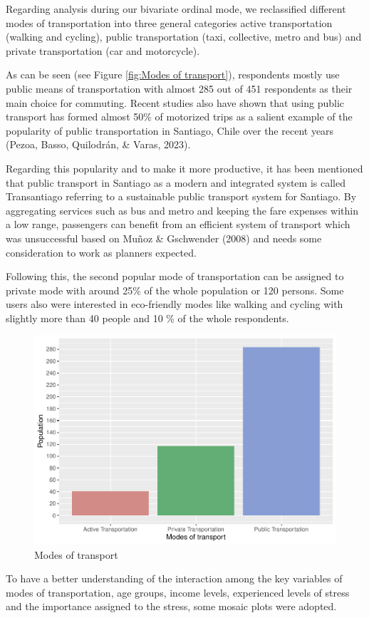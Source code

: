 \documentclass[
11pt, %
oneside, %
english, %
singlespacing, %
]{macthesis} %
\begin{document}
Regarding analysis during our bivariate ordinal mode, we reclassified different modes of transportation into three general categories active transportation (walking and cycling), public transportation (taxi, collective, metro and bus) and private transportation (car and motorcycle).

As can be seen (see Figure \ref{fig:Modes of transport}), respondents mostly use public means of transportation with almost 285 out of 451 respondents as their main choice for commuting. Recent studies also have shown that using public transport has formed almost 50\% of motorized trips as a salient example of the popularity of public transportation in Santiago, Chile over the recent years (Pezoa, Basso, Quilodrán, \& Varas, 2023).

Regarding this popularity and to make it more productive, it has been mentioned that public transport in Santiago as a modern and integrated system is called Transantiago referring to a sustainable public transport system for Santiago. By aggregating services such as bus and metro and keeping the fare expenses within a low range, passengers can benefit from an efficient system of transport which was unsuccessful based on Muñoz \& Gschwender (2008) and needs some consideration to work as planners expected.

Following this, the second popular mode of transportation can be assigned to private mode with around 25\% of the whole population or 120 persons. Some users also were interested in eco-friendly modes like walking and cycling with slightly more than 40 people and 10 \% of the whole respondents.
\begin{figure}

{\centering \includegraphics[width=0.85\linewidth]{thesis_files/figure-latex/unnamed-chunk-25-1} 

}

\caption{\label{fig:Modes of transport}Modes of transport}\label{fig:unnamed-chunk-25}
\end{figure}
To have a better understanding of the interaction among the key variables of modes of transportation, age groups, income levels, experienced levels of stress and the importance assigned to the stress, some mosaic plots were adopted.
\end{document}
